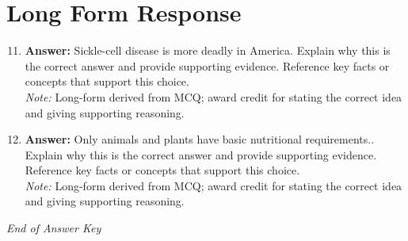 \documentclass[12pt]{article}
\begin{document}
\section*{Long Form Response}
\begin{enumerate}[label=\arabic*.]
\setcounter{enumi}{10}
\item \textbf{Answer:} Sickle-cell disease is more deadly in America. Explain why this is the correct answer and provide supporting evidence. Reference key facts or concepts that support this choice.
\\ \textit{Note:} Long-form derived from MCQ; award credit for stating the correct idea and giving supporting reasoning.
\item \textbf{Answer:} Only animals and plants have basic nutritional requirements.. Explain why this is the correct answer and provide supporting evidence. Reference key facts or concepts that support this choice.
\\ \textit{Note:} Long-form derived from MCQ; award credit for stating the correct idea and giving supporting reasoning.
\end{enumerate}

\vfill
\noindent\textit{End of Answer Key}
\end{document}
